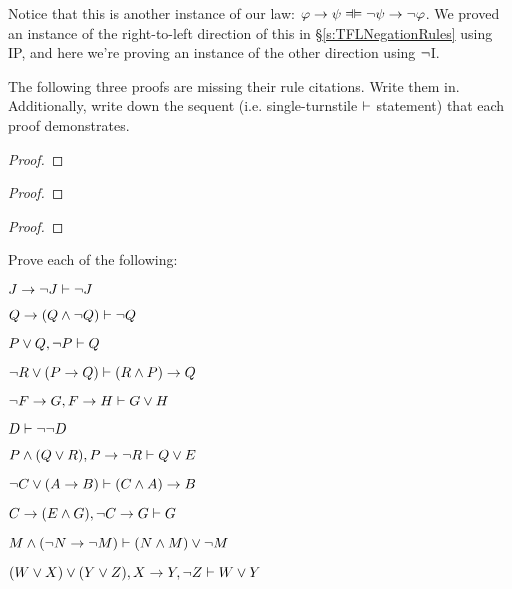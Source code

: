 Notice that this is another instance of our  law: $\meta{\varphi} \eif \meta{\psi} \lequiv \enot \meta{\psi} \eif \enot \meta{\varphi}$.  We proved an instance of the right-to-left direction of this in \S\ref{s:TFLNegationRules} using IP, and here we're proving an instance of the other direction using $\neg$I.

\practiceproblems
\problempart
The following three proofs are missing their rule citations. Write them in. Additionally, write down the sequent (i.e. single-turnstile $\vdash$ statement) that each proof demonstrates.
\begin{multicols}{2}
\begin{proof}
\end{proof}

\begin{proof}
\open
\close
{}%
\end{proof}

\begin{proof}
\open
\close
\open
\close
{}%
\end{proof}
\end{multicols}

\problempart
Prove each of the following:
\begin{earg}
\item $J\rightarrow\neg J \vdash \neg J$
\item $Q\rightarrow(Q\wedge\neg Q) \vdash \neg Q$
\item $P \vee Q, \neg P \vdash Q$
\item $\neg R \vee (P \rightarrow Q) \vdash (R \wedge P) \rightarrow Q$
\item $\neg F\rightarrow G, F\rightarrow H \vdash G\vee H$
\item $D \vdash \neg \neg D$
\item $P \wedge (Q\vee R), P\rightarrow \neg R \vdash Q\vee E$
\item $\neg C \vee (A \rightarrow B) \vdash (C \wedge A) \rightarrow B$
\item $C\rightarrow(E\wedge G), \neg C \rightarrow G \vdash G$
\item $M \wedge (\neg N \rightarrow \neg M) \vdash (N \wedge M) \vee \neg M$
\item $(W \vee X) \vee (Y \vee Z), X\rightarrow Y, \neg Z \vdash W\vee Y$


\end{earg}




